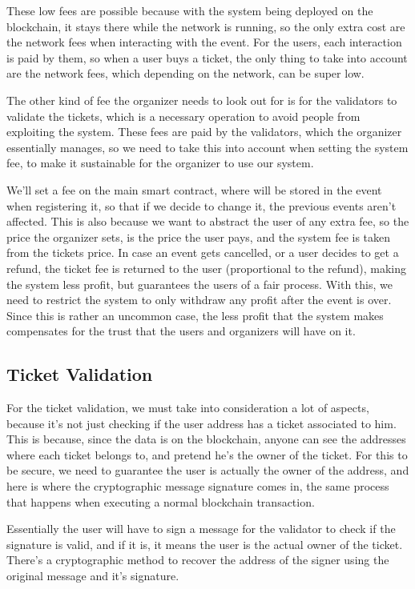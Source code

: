 These low fees are possible because with the system being deployed on the blockchain, it stays there while the network is running, so the only extra cost are the network fees when interacting with the event. For the users, each interaction is paid by them, so when a user buys a ticket, the only thing to take into account are the network fees, which depending on the network, can be super low.

The other kind of fee the organizer needs to look out for is for the validators to validate the tickets, which is a necessary operation to avoid people from exploiting the system. These fees are paid by the validators, which the organizer essentially manages, so we need to take this into account when setting the system fee, to make it sustainable for the organizer to use our system.

We'll set a fee on the main smart contract, where will be stored in the event when registering it, so that if we decide to change it, the previous events aren't affected. This is also because we want to abstract the user of any extra fee, so the price the organizer sets, is the price the user pays, and the system fee is taken from the tickets price. In case an event gets cancelled, or a user decides to get a refund, the ticket fee is returned to the user (proportional to the refund), making the system less profit, but guarantees the users of a fair process. With this, we need to restrict the system to only withdraw any profit after the event is over. Since this is rather an uncommon case, the less profit that the system makes compensates for the trust that the users and organizers will have on it.

\subsection{Ticket Validation}
\label{subsec:ticket_validation}

For the ticket validation, we must take into consideration a lot of aspects, because it's not just checking if the user address has a ticket associated to him. This is because, since the data is on the blockchain, anyone can see the addresses where each ticket belongs to, and pretend he's the owner of the ticket. For this to be secure, we need to guarantee the user is actually the owner of the address, and here is where the cryptographic message signature comes in, the same process that happens when executing a normal blockchain transaction.

Essentially the user will have to sign a message for the validator to check if the signature is valid, and if it is, it means the user is the actual owner of the ticket. There's a cryptographic method to recover the address of the signer using the original message and it's signature.

